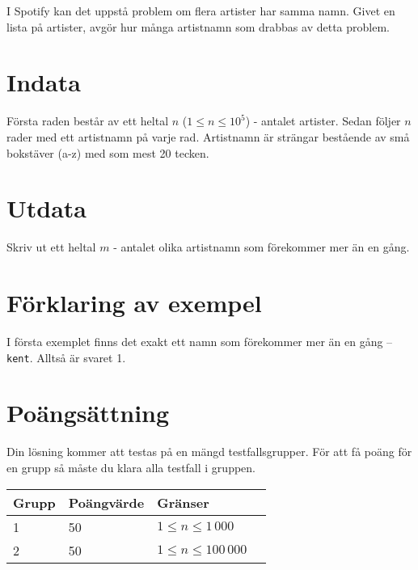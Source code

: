 
I Spotify kan det uppstå problem om flera artister har samma namn. Givet en lista på artister, avgör hur många artistnamn som drabbas av detta problem.

\section*{Indata}

Första raden består av ett heltal $n$ ($1 \leq n \leq 10^5$) - antalet artister. Sedan följer $n$ rader med ett artistnamn på varje rad. Artistnamn är strängar bestående av små bokstäver (a-z) med som mest 20 tecken.

\section*{Utdata}

Skriv ut ett heltal $m$ - antalet olika artistnamn som förekommer mer än en gång.

\section*{Förklaring av exempel}

I första exemplet finns det exakt ett namn som förekommer mer än en gång -- \texttt{kent}. Alltså är svaret 1.

\section*{Poängsättning}

Din lösning kommer att testas på en mängd testfallsgrupper. För att få poäng för en grupp
så måste du klara alla testfall i gruppen.

\begin{tabular}{| l | l | l | l |}
\hline
Grupp & Poängvärde & Gränser \\ \hline
1     & 50         & $ 1 \le n \le 1\,000$ \\ \hline
2     & 50         & $ 1 \le n \le 100\,000$ \\ \hline
\end{tabular}
